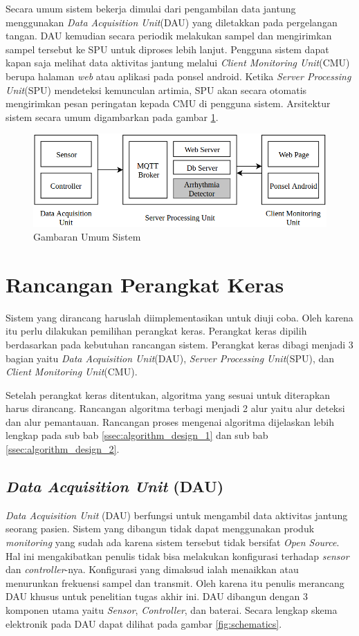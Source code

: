 Secara umum sistem bekerja dimulai dari pengambilan data jantung menggunakan \textit{Data Acquisition Unit}(DAU) yang diletakkan pada pergelangan tangan. DAU kemudian secara periodik melakukan sampel dan mengirimkan sampel tersebut ke SPU untuk diproses lebih lanjut. Pengguna sistem dapat kapan saja melihat data aktivitas jantung melalui \textit{Client Monitoring Unit}(CMU) berupa halaman \textit{web} atau aplikasi pada ponsel android. Ketika \textit{Server Processing Unit}(SPU) mendeteksi kemunculan artimia, SPU akan secara otomatis mengirimkan pesan peringatan kepada CMU di pengguna sistem. Arsitektur sistem secara umum digambarkan pada gambar \ref{fig:gambar_umum}.

\begin{figure}[H]
	\centering
	\includegraphics[scale=0.45]{images/gambar_umum.png}
    \caption{Gambaran Umum Sistem}
	\label{fig:gambar_umum}
\end{figure}

\section{Rancangan Perangkat Keras}
Sistem yang dirancang haruslah diimplementasikan untuk diuji coba. Oleh karena itu perlu dilakukan pemilihan perangkat keras. Perangkat keras dipilih berdasarkan pada kebutuhan rancangan sistem. Perangkat keras dibagi menjadi 3 bagian yaitu \textit{Data Acquisition Unit}(DAU), \textit{Server Processing Unit}(SPU), dan \textit{Client Monitoring Unit}(CMU).

Setelah perangkat keras ditentukan, algoritma yang sesuai untuk diterapkan harus dirancang. Rancangan algoritma terbagi menjadi 2 alur yaitu alur deteksi dan alur pemantauan. Rancangan proses mengenai algoritma dijelaskan lebih lengkap pada sub bab \ref{ssec:algorithm_design_1} dan sub bab \ref{ssec:algorithm_design_2}.

\subsection{\textit{Data Acquisition Unit} (DAU)}
\textit{Data Acquisition Unit} (DAU) berfungsi untuk mengambil data aktivitas jantung seorang pasien. Sistem yang dibangun tidak dapat menggunakan produk \textit{monitoring} yang sudah ada karena sistem tersebut tidak bersifat \textit{Open Source}. Hal ini mengakibatkan penulis tidak bisa melakukan konfigurasi terhadap \textit{sensor} dan \textit{controller}-nya. Konfigurasi yang dimaksud ialah menaikkan atau menurunkan frekuensi sampel dan transmit. Oleh karena itu penulis merancang DAU khusus untuk penelitian tugas akhir ini. DAU dibangun dengan 3 komponen utama yaitu \textit{Sensor}, \textit{Controller}, dan baterai. Secara lengkap skema elektronik pada DAU dapat dilihat pada gambar \ref{fig:schematics}.


